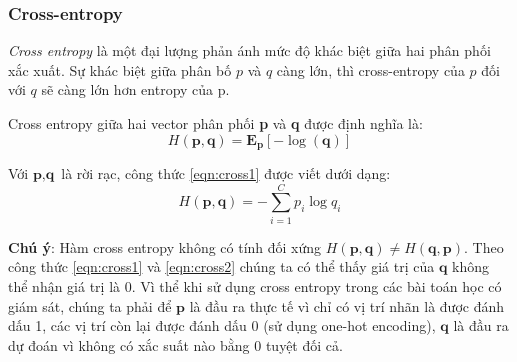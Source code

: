 \subsubsection{Cross-entropy}
\hspace{5mm} \textit{Cross entropy} là một đại lượng phản ánh mức độ khác biệt giữa hai phân phối xắc xuất. Sự khác biệt giữa phân bố $p$ và $q$ càng lớn, thì cross-entropy của $p$ đối với $q$ sẽ càng lớn hơn entropy của p.\par 
Cross entropy giữa hai vector phân phối \textbf{p} và \textbf{q} được định nghĩa là:
\begin{equation}
\label{eqn:cross1}
H(\textbf{p},\textbf{q}) = \textbf{E}_\textbf{p}[-\log(\textbf{q})]
\end{equation}\par
	Với $\textbf{p},\textbf{q} $ là rời rạc, công thức \ref{eqn:cross1} được viết dưới dạng:
\begin{equation}
\label{eqn:cross2}
H(\textbf{p}, \textbf{q}) =-\sum_{i=1}^C p_i \log q_i 
\end{equation}\par

\textbf{Chú ý}: Hàm cross entropy không có tính đối xứng $H(\textbf{p}, \textbf{q}) \neq H(\textbf{q}, \textbf{p})$. Theo công thức \ref{eqn:cross1} và \ref{eqn:cross2} chúng ta có thể thấy giá trị của $\textbf{q}$ không thể nhận giá trị là 0. Vì thể khi sử dụng cross entropy trong các bài toán học có giám sát, chúng ta phải để $\textbf{p}$ là đầu ra thực tế vì chỉ có vị trí nhãn là được đánh dấu 1, các vị trí còn lại được đánh dấu 0 (sử dụng one-hot encoding), $\textbf{q}$ là đầu ra dự đoán vì không có xắc suất nào bằng 0 tuyệt đối cả.

